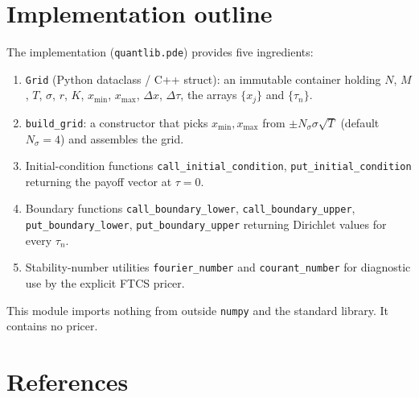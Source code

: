 \documentclass[11pt,a4paper]{article}
\begin{document}
\section{Implementation outline}

The implementation (\texttt{quantlib.pde}) provides five ingredients:
\begin{enumerate}[leftmargin=2em]
\item \texttt{Grid} (Python dataclass / C++ struct): an immutable
      container holding $N$, $M$, $T$, $\sigma$, $r$, $K$,
      $x_{\min}$, $x_{\max}$, $\Delta x$, $\Delta \tau$, the arrays
      $\{x_j\}$ and $\{\tau_n\}$.
\item \texttt{build\_grid}: a constructor that picks
      $x_{\min}, x_{\max}$ from
      $\pm N_\sigma \sigma \sqrt{T}$ (default $N_\sigma = 4$) and
      assembles the grid.
\item Initial-condition functions
      \texttt{call\_initial\_condition}, \texttt{put\_initial\_condition}
      returning the payoff vector at $\tau = 0$.
\item Boundary functions \texttt{call\_boundary\_lower},
      \texttt{call\_boundary\_upper}, \texttt{put\_boundary\_lower},
      \texttt{put\_boundary\_upper} returning Dirichlet values for
      every $\tau_n$.
\item Stability-number utilities \texttt{fourier\_number} and
      \texttt{courant\_number} for diagnostic use by the explicit
      FTCS pricer.
\end{enumerate}
This module imports nothing from outside \texttt{numpy} and the
standard library. It contains no pricer.

\section*{References}\label{sec:refs}
\end{document}
